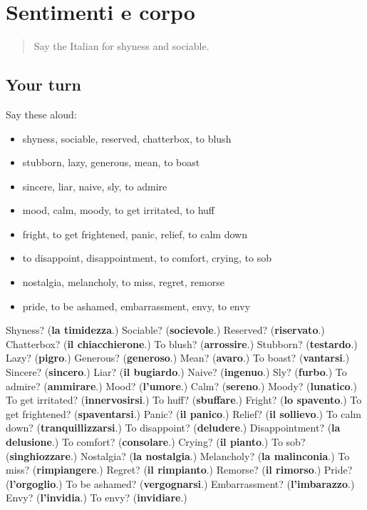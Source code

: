 \section[(dialogue)]{Sentimenti e corpo}

\label{lesson:IT-R478-ripasso-471-478}



\begin{quote}
Say the Italian for shyness and sociable.
\end{quote}

\subsection*{Your turn}
Say these aloud:

\begin{itemize}
\raggedright
  \item shyness, sociable, reserved, chatterbox, to blush
  \item stubborn, lazy, generous, mean, to boast
  \item sincere, liar, naive, sly, to admire
  \item mood, calm, moody, to get irritated, to huff
  \item fright, to get frightened, panic, relief, to calm down
  \item to disappoint, disappointment, to comfort, crying, to sob
  \item nostalgia, melancholy, to miss, regret, remorse
  \item pride, to be ashamed, embarrassment, envy, to envy
\end{itemize}

\begin{tcolorbox}[breakable,colback=teal!4,colframe=teal!35!black,title={Before you move on}]
Shyness? (\textbf{la timidezza}.) Sociable? (\textbf{socievole}.) Reserved? (\textbf{riservato}.) Chatterbox? (\textbf{il chiacchierone}.) To blush? (\textbf{arrossire}.) Stubborn? (\textbf{testardo}.) Lazy? (\textbf{pigro}.) Generous? (\textbf{generoso}.) Mean? (\textbf{avaro}.) To boast? (\textbf{vantarsi}.) Sincere? (\textbf{sincero}.) Liar? (\textbf{il bugiardo}.) Naive? (\textbf{ingenuo}.) Sly? (\textbf{furbo}.) To admire? (\textbf{ammirare}.) Mood? (\textbf{l'umore}.) Calm? (\textbf{sereno}.) Moody? (\textbf{lunatico}.) To get irritated? (\textbf{innervosirsi}.) To huff? (\textbf{sbuffare}.) Fright? (\textbf{lo spavento}.) To get frightened? (\textbf{spaventarsi}.) Panic? (\textbf{il panico}.) Relief? (\textbf{il sollievo}.) To calm down? (\textbf{tranquillizzarsi}.) To disappoint? (\textbf{deludere}.) Disappointment? (\textbf{la delusione}.) To comfort? (\textbf{consolare}.) Crying? (\textbf{il pianto}.) To sob? (\textbf{singhiozzare}.) Nostalgia? (\textbf{la nostalgia}.) Melancholy? (\textbf{la malinconia}.) To miss? (\textbf{rimpiangere}.) Regret? (\textbf{il rimpianto}.) Remorse? (\textbf{il rimorso}.) Pride? (\textbf{l'orgoglio}.) To be ashamed? (\textbf{vergognarsi}.) Embarrassment? (\textbf{l'imbarazzo}.) Envy? (\textbf{l'invidia}.) To envy? (\textbf{invidiare}.)
\end{tcolorbox}
